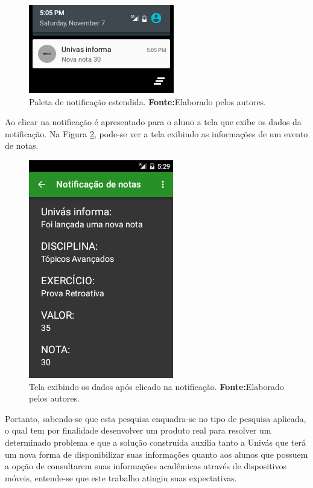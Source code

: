 \begin{figure}[h!]
	\centerline{\includegraphics[scale=0.8]{./imagens/3_discussao_resultados/dr3.png}}
	\caption[Paleta de notificação estendida]{Paleta de notificação estendida.
		\textbf{Fonte:}Elaborado pelos autores.}
	\label{fig:dr3}
\end{figure}

\pagebreak

	\par Ao clicar na notificação é apresentado para o aluno a tela que exibe os
dados da notificação. Na Figura \ref{fig:dr4}, pode-se ver a tela exibindo as
informações de um evento de notas.

\begin{figure}[h!]
	\centerline{\includegraphics[scale=0.8]{./imagens/3_discussao_resultados/dr4.png}}
	\caption[Tela exibindo os dados após clicado na notificação]{Tela exibindo os
	dados após clicado na notificação.
	\textbf{Fonte:}Elaborado pelos autores.}
	\label{fig:dr4}
\end{figure}
\pagebreak

	\par Portanto, sabendo-se que esta pesquisa enquadra-se no tipo de pesquisa
aplicada, o qual tem por finalidade desenvolver um produto real para resolver
um determinado problema e que a solução construída auxilia tanto a Univás que
terá um nova forma de disponibilizar suas informações quanto aos alunos que
possuem a opção de consultarem suas informações acadêmicas através de
dispositivos móveis, entende-se que este trabalho atingiu suas expectativas.

	